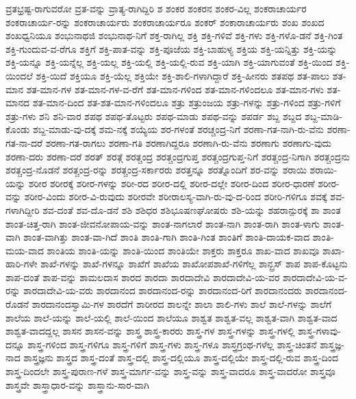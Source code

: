 {ವ್ರತಭ್ರಷ್ಟ-ರಾಗುವರೋ
ವ್ರತ-ವನ್ನು
ವ್ರಾತ್ಯ-ರಾಗಿದ್ದಿರಿ
ಶ
ಶಂಕರ
ಶಂಕರನ
ಶಂಕರ-ವಿಲ್ಲ
ಶಂಕರಾಚಾರ್ಯರ
ಶಂಕರಾಚಾರ್ಯ-ರನ್ನು
ಶಂಕರಾಚಾರ್ಯರು
ಶಂಕರಾಚಾರ್ಯರೂ
ಶಂಕರ್
ಶಂಕಾರಾಚಾರ್ಯರು
ಶಂಖ
ಶಂಖದ
ಶಂಖಧ್ವನಿಯೂ
ಶಂಭುನಾಥಜಿ
ಶಂಭುನಾಥ-ನಿಗೆ
ಶಕ್ತ-ರಾಗಿಲ್ಲ
ಶಕ್ತಿ
ಶಕ್ತಿ-ಗಳಿವೆ
ಶಕ್ತಿ-ಗಳು
ಶಕ್ತಿ-ಗಳೊ-ಡನೆ
ಶಕ್ತಿ-ಗಿಂತ
ಶಕ್ತಿ-ಗುಂದುವ-ವ-ರೆಗೂ
ಶಕ್ತಿಗೆ
ಶಕ್ತಿ-ಪಾತ-ವನ್ನು
ಶಕ್ತಿ-ಪೂಜೆಯ
ಶಕ್ತಿ-ಬಾಹುಳ್ಯ
ಶಕ್ತಿಯ
ಶಕ್ತಿ-ಯನ್ನಿತ್ತು
ಶಕ್ತಿ-ಯನ್ನು
ಶಕ್ತಿ-ಯನ್ನೂ
ಶಕ್ತಿ-ಯನ್ನೆಲ್ಲ
ಶಕ್ತಿ-ಯಲ್ಲ
ಶಕ್ತಿ-ಯಲ್ಲಿ
ಶಕ್ತಿ-ಯಲ್ಲಿ-ರುವ
ಶಕ್ತಿ-ಯಾಗಿ
ಶಕ್ತಿ-ಯಾಗುವಂತೆ
ಶಕ್ತಿ-ಯಿಂದ
ಶಕ್ತಿ-ಯಿಂದಲೆ
ಶಕ್ತಿ-ಯಿದೆ
ಶಕ್ತಿಯೂ
ಶಕ್ತಿ-ಯೆಲ್ಲ
ಶಕ್ತಿಯೇ
ಶಕ್ತಿ-ಶಾಲಿ-ಗಳಾಗಿದ್ದಾರೆ
ಶಕ್ತಿ-ಹೀನರು
ಶತಪಥ
ಶತ-ಪಾಲು
ಶತ-ಮಾನ
ಶತ-ಮಾನ-ಗಳ
ಶತ-ಮಾನ-ಗಳ-ವ-ರೆಗೆ
ಶತ-ಮಾನ-ಗಳಿಂದ
ಶತ-ಮಾನ-ಗಳಿಂದಲೂ
ಶತ-ಮಾನ-ಗಳು
ಶತ-ಮಾನದ
ಶತ-ಮಾನ-ದಿಂದ
ಶತ-ಶತ-ಮಾನ-ಗಳಿಂದಲೂ
ಶತ್ರು
ಶತ್ರುಂಜಯ
ಶತ್ರು-ಗಳನ್ನು
ಶತ್ರು-ಗಳಿಂದ
ಶತ್ರು-ಗಳಿಗೆ
ಶತ್ರು-ಗಳು
ಶನಿ
ಶನಿ-ವಾರ
ಶಪಥ
ಶಪಥ-ತೊಟ್ಟರು
ಶಪಥ-ಮಾಡು
ಶಪಥ-ವನ್ನು
ಶಪರ್ಡ
ಶಬ್ದ
ಶಬ್ದದ
ಶಬ್ದ-ಮಾಡಿ-ಕೊಂಡು
ಶಬ್ದ-ಮಾಡು-ವು-ದಕ್ಕೆ
ಶಮ-ನಕ್ಕೆ
ಶಯ್ಯೆಯ
ಶರ-ಗಳಂತೆ
ಶರಚ್ಚಂದ್ರ-ನಿಗೆ
ಶರಣಾ-ಗತ-ನಾಗಿ-ರು-ವೆನು
ಶರಣಾ-ಗತ-ನಾ-ದರೆ
ಶರಣಾ-ಗತ-ರಾಗಲು
ಶರಣಾ-ಗತಿ
ಶರಣಾಗಿದ್ದರೂ
ಶರಣಾಗಿ-ರು-ವೆನು
ಶರಣಾಗು
ಶರಣಾಗು-ವುದು
ಶರಣಾ-ದರು
ಶರಣಾ-ದರೆ
ಶರತ್
ಶರತ್ಗೆ
ಶರತ್ಚಂದ್ರ
ಶರತ್ಚಂದ್ರಗುಪ್ತ
ಶರತ್ಚಂದ್ರಗುಪ್ತ-ನಿಗೆ
ಶರತ್ಚಂದ್ರ-ನಿಗಾಗಿ
ಶರತ್ಚಂದ್ರನು
ಶರತ್ಚಂದ್ರ-ನೊಡನೆ
ಶರತ್ಚಂದ್ರ-ರನ್ನು
ಶರತ್ಚಂದ್ರ-ಸರ್ಕಾರರು
ಶರತ್ತನ್ನೂ
ಶರತ್ನೊಂದಿಗೆ
ಶರ-ವನ್ನು
ಶರಾಯಿ
ಶರಾಯಿ-ಯನ್ನು
ಶರೀರ
ಶರೀರಕ್ಕೆ
ಶರೀರ-ಗಳನ್ನು
ಶರೀ-ರದ
ಶರೀರ-ದಲ್ಲಿ
ಶರೀರ-ದಲ್ಲೇ
ಶರೀರ-ದಿಂದ
ಶರೀರ-ಧಾರಣೆ
ಶರೀರ-ವನ್ನು
ಶರೀರ-ವಿಂದು
ಶರೀರ-ವಿ-ರುವುದು
ಶರೀರವೇ
ಶರೀರಾಲಸ್ಯ-ವಾಗಿ-ರು-ವು-ದ-ರಿಂದ
ಶರೀರಿ-ಗಳಿಗೂ
ಶವಕ್ಕೆ
ಶವ-ಗಳಾಗಿದ್ದೀರಿ
ಶವ-ದಂತೆ
ಶವ-ದೊ-ಡನೆ
ಶಶಿ
ಶಶಿಧರ
ಶಶಿಭೂಷಣಘೋಷರು
ಶಶಿ-ಯನ್ನು
ಶಹರಾನ್ಪುರಕ್ಕೆ
ಶಾ
ಶಾಂತ
ಶಾಂತ-ಚಿತ್ತ-ರಾಗಿ
ಶಾಂತ-ಜೀವನೋಪಾಯ-ವನ್ನು
ಶಾಂತ-ನಾಗಲಾರೆ
ಶಾಂತ-ನಾಗಿ
ಶಾಂತ-ರಾಗಿ
ಶಾಂತ-ಳಾಗು
ಶಾಂತ-ವಾಗಿ
ಶಾಂತ-ವಾಗಿತ್ತು
ಶಾಂತ-ವಾ-ಗಿದೆ
ಶಾಂತಿ
ಶಾಂತಿ-ಗಾಗಿ
ಶಾಂತಿ-ಗಿಂತ
ಶಾಂತಿಗೆ
ಶಾಂತಿ-ದಾಯಕ-ವಾದ
ಶಾಂತಿ-ಮಯ-ವಾದ
ಶಾಂತಿಯ
ಶಾಂತಿ-ಯನ್ನು
ಶಾಂತಿ-ಯಿಂದ
ಶಾಂತಿಯೇ
ಶಾಕ್ತರು
ಶಾಕ್ತರೂ
ಶಾಖ-ವಾದ
ಶಾಖವೂ
ಶಾಖಾ-ಹಾರಿ-ಗಳೇ
ಶಾಖೆ-ಗಳನ್ನು
ಶಾಖೆ-ಗಳನ್ನೂ
ಶಾಖೆಗೆ
ಶಾಖೆಯ
ಶಾಖೋಪಶಾಖೆ-ಗಳಿಗೆಲ್ಲ
ಶಾನ್ಬ್ರಸ್
ಶಾಪ
ಶಾಪ-ಕೊಟ್ಟನು
ಶಾಪ-ದಂತೆ
ಶಾಪ-ವನ್ನು
ಶಾಮಲದಾಸ
ಶಾರದ
ಶಾರದಾ
ಶಾರದಾದೇವಿ
ಶಾರದಾದೇವಿ-ಯ-ವರ
ಶಾರದಾದೇವಿ-ಯ-ವ-ರನ್ನು
ಶಾರದಾದೇವಿ-ಯ-ವರು
ಶಾರದಾನಂದ
ಶಾರದಾನಂದ-ರನ್ನು
ಶಾರದಾನಂದ-ರಿಗೆ
ಶಾರದಾನಂದರು
ಶಾರದಾನಂದ-ರೊಡನೆ
ಶಾರದಾನಂದಸ್ವಾಮಿ-ಗಳ
ಶಾರದೆಗೆ
ಶಾರೀರದ
ಶಾಲನ್ನೇ
ಶಾಲಾ
ಶಾಲಿ-ಗಳು
ಶಾಲೆ
ಶಾಲೆ-ಗಳನ್ನು
ಶಾಲೆಗೆ
ಶಾಲೆಯ
ಶಾಲೆ-ಯನ್ನು
ಶಾಲೆ-ಯಲ್ಲಿ
ಶಾಲೆ-ಯಿಂದ
ಶಾಲೆಯೂ
ಶಾಶ್ವತ
ಶಾಶ್ವತ-ವಲ್ಲ
ಶಾಶ್ವತ-ವಾಗಿ
ಶಾಶ್ವತ-ವಾದ
ಶಾಶ್ವತ-ವಾದದ್ದಲ್ಲ
ಶಾಸನ
ಶಾಸನ-ವನ್ನು
ಶಾಸ್ತ್ರ
ಶಾಸ್ತ್ರ-ಕಾರರು
ಶಾಸ್ತ್ರ-ಗಳ
ಶಾಸ್ತ್ರ-ಗಳನ್ನು
ಶಾಸ್ತ್ರ-ಗಳಲ್ಲಿ
ಶಾಸ್ತ್ರ-ಗಳಾವು-ದನ್ನೂ
ಶಾಸ್ತ್ರ-ಗಳಿಂದ
ಶಾಸ್ತ್ರ-ಗಳಿಗೂ
ಶಾಸ್ತ್ರ-ಗಳಿಗೆ
ಶಾಸ್ತ್ರ-ಗಳು
ಶಾಸ್ತ್ರ-ಗಳೂ
ಶಾಸ್ತ್ರಗ್ರಂಥ-ಗಳೆಲ್ಲ
ಶಾಸ್ತ್ರ-ಚಿಂತನೆ
ಶಾಸ್ತ್ರಜ್ಞ-ನಾದ
ಶಾಸ್ತ್ರಜ್ಞನು
ಶಾಸ್ತ್ರದ
ಶಾಸ್ತ್ರ-ದಂತೆ
ಶಾಸ್ತ್ರ-ದಲ್ಲಿ
ಶಾಸ್ತ್ರ-ದಲ್ಲಿಯೂ
ಶಾಸ್ತ್ರ-ದಲ್ಲಿಯೇ
ಶಾಸ್ತ್ರ-ದಲ್ಲಿ-ರುವ
ಶಾಸ್ತ್ರ-ದಿಂದ
ಶಾಸ್ತ್ರ-ದಿಂದಲೇ
ಶಾಸ್ತ್ರ-ಪುರಾಣ-ಗಳೆ
ಶಾಸ್ತ್ರ-ಮಾರ್ಗ-ವನ್ನು
ಶಾಸ್ತ್ರ-ವನ್ನು
ಶಾಸ್ತ್ರ-ವಾದರೂ
ಶಾಸ್ತ್ರ-ವಾದರೋ
ಶಾಸ್ತ್ರವೂ
ಶಾಸ್ತ್ರವೇ
ಶಾಸ್ತ್ರಾಧಾರ-ವನ್ನು
ಶಾಸ್ತ್ರಾನು-ಸಾರ-ವಾಗಿ
}
